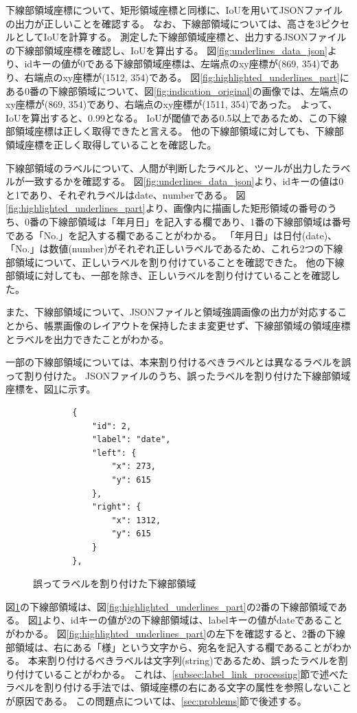 下線部領域座標について、矩形領域座標と同様に、IoUを用いてJSONファイルの出力が正しいことを確認する。
なお、下線部領域については、高さを3ピクセルとしてIoUを計算する。
測定した下線部領域座標と、出力するJSONファイルの下線部領域座標を確認し、IoUを算出する。
図\ref{fig:underlines_data_json}より、idキーの値が0である下線部領域座標は、左端点のxy座標が(869, 354)であり、右端点のxy座標が(1512, 354)である。
図\ref{fig:highlighted_underlines_part}にある0番の下線部領域について、図\ref{fig:indication_original}の画像では、左端点のxy座標が(869, 354)であり、右端点のxy座標が(1511, 354)であった。
よって、IoUを算出すると、0.99となる。
IoUが閾値である0.5以上であるため、この下線部領域座標は正しく取得できたと言える。
他の下線部領域に対しても、下線部領域座標を正しく取得していることを確認した。

下線部領域のラベルについて、人間が判断したラベルと、ツールが出力したラベルが一致するかを確認する。
図\ref{fig:underlines_data_json}より、idキーの値は0と1であり、それぞれラベルはdate、numberである。
図\ref{fig:highlighted_underlines_part}より、画像内に描画した矩形領域の番号のうち、0番の下線部領域は「年月日」を記入する欄であり、1番の下線部領域は番号である「No.」を記入する欄であることがわかる。
「年月日」は日付(date)、「No.」は数値(number)がそれぞれ正しいラベルであるため、これら2つの下線部領域について、正しいラベルを割り付けていることを確認できた。
他の下線部領域に対しても、一部を除き、正しいラベルを割り付けていることを確認した。

また、下線部領域について、JSONファイルと領域強調画像の出力が対応することから、帳票画像のレイアウトを保持したまま変更せず、下線部領域の領域座標とラベルを出力できたことがわかる。

一部の下線部領域については、本来割り付けるべきラベルとは異なるラベルを誤って割り付けた。
JSONファイルのうち、誤ったラベルを割り付けた下線部領域座標を、図\ref{fig:underlines_data_miss_json}に示す。

\lstset{language=}
\begin{figure}[tp]
    \begin{lstlisting}
        {
            "id": 2,
            "label": "date",
            "left": {
                "x": 273,
                "y": 615
            },
            "right": {
                "x": 1312,
                "y": 615
            }
        },
    \end{lstlisting}
    \caption{誤ってラベルを割り付けた下線部領域}\label{fig:underlines_data_miss_json}
\end{figure}

図\ref{fig:underlines_data_miss_json}の下線部領域は、図\ref{fig:highlighted_underlines_part}の2番の下線部領域である。
図\ref{fig:underlines_data_miss_json}より、idキーの値が2の下線部領域は、labelキーの値がdateであることがわかる。
図\ref{fig:highlighted_underlines_part}の左下を確認すると、2番の下線部領域は、右にある「様」という文字から、宛名を記入する欄であることがわかる。
本来割り付けるべきラベルは文字列(string)であるため、誤ったラベルを割り付けていることがわかる。
これは、\ref{subsec:label_link_processing}節で述べたラベルを割り付ける手法では、領域座標の右にある文字の属性を参照しないことが原因である。
この問題点については、\ref{sec:problems}節で後述する。